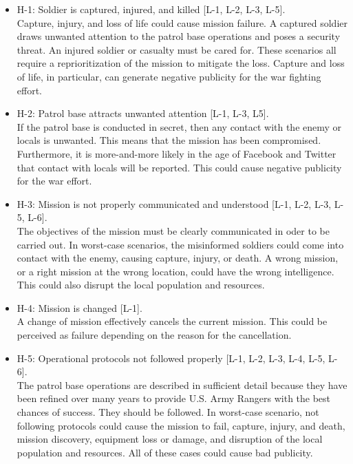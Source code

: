 \documentclass[../../main/main.tex]{subfiles}
\begin{document}
\begin{itemize}
\item H-1: Soldier is captured, injured, and killed [L-1, L-2, L-3, L-5].\\
Capture, injury, and loss of life could cause mission failure.  A captured soldier draws unwanted attention to the patrol base operations and poses a security threat.  An injured soldier or casualty must be cared for.  These scenarios all require a reprioritization of the mission to mitigate the loss.  Capture and loss of life, in particular, can generate negative publicity for the war fighting effort. 

\item H-2: Patrol base attracts unwanted attention [L-1, L-3, L5].\\
If the patrol base is conducted in secret, then any contact with the enemy or locals is unwanted.  This means that the mission has been compromised.  Furthermore, it is more-and-more likely in the age of Facebook and Twitter that contact with locals will be reported.  This could cause negative publicity for the war effort. 

\item H-3: Mission is not properly communicated and understood [L-1, L-2, L-3, L-5, L-6].\\
The objectives of the mission must be clearly communicated in oder to be carried out.  In worst-case scenarios, the misinformed soldiers could come into contact with the enemy, causing capture, injury, or death.  A wrong mission, or a right mission at the wrong location, could have the wrong intelligence.  This could also disrupt the local population and resources.

\item H-4: Mission is changed [L-1].\\
A change of mission effectively cancels the current mission. This could be perceived as failure depending on the reason for the cancellation.

\item H-5: Operational protocols not followed properly [L-1, L-2, L-3, L-4, L-5, L-6].\\
The patrol base operations are described in sufficient detail because they have been refined over many years to provide U.S. Army Rangers with the best chances of success.  They should be followed.  In worst-case scenario, not following protocols could cause the mission to fail, capture, injury, and death, mission discovery, equipment loss or damage, and disruption of the local population and resources.  All of these cases could cause bad publicity.


\end{itemize}
\end{document}
